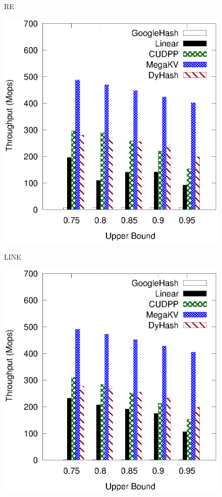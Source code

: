 \begin{figure}[h]
\begin{minipage}{0.19\linewidth}
	\centerline{RE}
	\end{minipage}
	\hfill
	\begin{minipage}{0.19\linewidth}\centering
	\includegraphics[width=\linewidth]{pic/static-upper/upper_insert_tpch.eps}
	\centerline{LINE}
	\end{minipage}
	\hfill
        \begin{minipage}{0.19\linewidth}\centering
	\includegraphics[width=\linewidth]{pic/static-upper/upper_insert_random.eps}

\end{minipage}
\end{figure}

